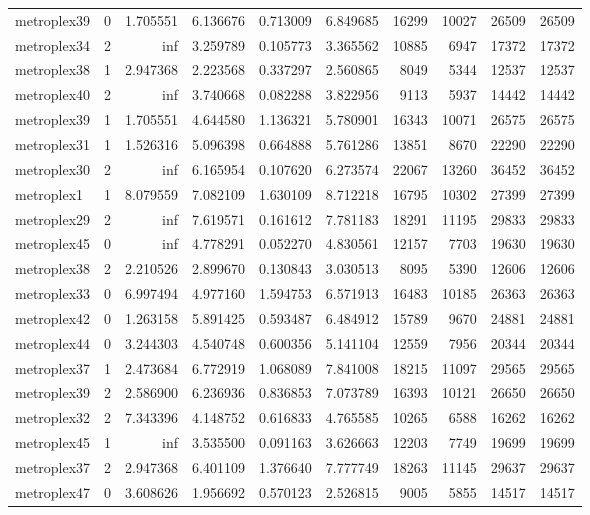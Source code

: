 \begin{longtable}{|l|r|r|r|r|r|r|r|r|r|}
metroplex39 & 0 & 1.705551 & 6.136676 & 0.713009 & 6.849685 & 16299 & 10027 & 26509 & 26509 \\
metroplex34 & 2 & inf & 3.259789 & 0.105773 & 3.365562 & 10885 & 6947 & 17372 & 17372 \\
metroplex38 & 1 & 2.947368 & 2.223568 & 0.337297 & 2.560865 & 8049 & 5344 & 12537 & 12537 \\
metroplex40 & 2 & inf & 3.740668 & 0.082288 & 3.822956 & 9113 & 5937 & 14442 & 14442 \\
metroplex39 & 1 & 1.705551 & 4.644580 & 1.136321 & 5.780901 & 16343 & 10071 & 26575 & 26575 \\
metroplex31 & 1 & 1.526316 & 5.096398 & 0.664888 & 5.761286 & 13851 & 8670 & 22290 & 22290 \\
metroplex30 & 2 & inf & 6.165954 & 0.107620 & 6.273574 & 22067 & 13260 & 36452 & 36452 \\
metroplex1 & 1 & 8.079559 & 7.082109 & 1.630109 & 8.712218 & 16795 & 10302 & 27399 & 27399 \\
metroplex29 & 2 & inf & 7.619571 & 0.161612 & 7.781183 & 18291 & 11195 & 29833 & 29833 \\
metroplex45 & 0 & inf & 4.778291 & 0.052270 & 4.830561 & 12157 & 7703 & 19630 & 19630 \\
metroplex38 & 2 & 2.210526 & 2.899670 & 0.130843 & 3.030513 & 8095 & 5390 & 12606 & 12606 \\
metroplex33 & 0 & 6.997494 & 4.977160 & 1.594753 & 6.571913 & 16483 & 10185 & 26363 & 26363 \\
metroplex42 & 0 & 1.263158 & 5.891425 & 0.593487 & 6.484912 & 15789 & 9670 & 24881 & 24881 \\
metroplex44 & 0 & 3.244303 & 4.540748 & 0.600356 & 5.141104 & 12559 & 7956 & 20344 & 20344 \\
metroplex37 & 1 & 2.473684 & 6.772919 & 1.068089 & 7.841008 & 18215 & 11097 & 29565 & 29565 \\
metroplex39 & 2 & 2.586900 & 6.236936 & 0.836853 & 7.073789 & 16393 & 10121 & 26650 & 26650 \\
metroplex32 & 2 & 7.343396 & 4.148752 & 0.616833 & 4.765585 & 10265 & 6588 & 16262 & 16262 \\
metroplex45 & 1 & inf & 3.535500 & 0.091163 & 3.626663 & 12203 & 7749 & 19699 & 19699 \\
metroplex37 & 2 & 2.947368 & 6.401109 & 1.376640 & 7.777749 & 18263 & 11145 & 29637 & 29637 \\
metroplex47 & 0 & 3.608626 & 1.956692 & 0.570123 & 2.526815 & 9005 & 5855 & 14517 & 14517 \\

\end{longtable}
